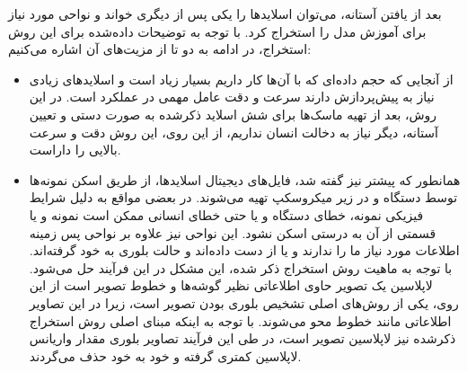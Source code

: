 بعد از یافتن آستانه، می‌توان اسلاید‌ها را یکی پس از دیگری خواند و نواحی مورد نیاز برای آموزش مدل را استخراج کرد.
با توجه به توضیحات داده‌شده برای این روش استخراج، در ادامه به دو تا از مزیت‌های آن اشاره می‌کنیم:
\begin{itemize}
    \item از آنجایی که حجم داده‌ای که با آن‌ها کار داریم بسیار زیاد است و اسلاید‌های زیادی نیاز به پیش‌پردازش دارند سرعت و دقت عامل مهمی در عملکرد است.
    در این روش، بعد از تهیه ماسک‌ها برای شش اسلاید ذکر‌شده به صورت دستی و تعیین آستانه، دیگر نیاز به دخالت انسان نداریم، از این روی، این روش دقت و سرعت بالایی را داراست.
    \item همانطور که پیشتر نیز گفته شد، فایل‌های دیجیتال اسلاید‌ها، از طریق اسکن نمونه‌ها توسط دستگاه و در زیر میکروسکپ تهیه می‌شوند.
    در بعضی مواقع به دلیل شرایط فیزیکی نمونه، خطای دستگاه و یا حتی خطای انسانی ممکن است نمونه و یا قسمتی از آن به درستی اسکن نشود.
    این نواحی نیز علاوه بر نواحی پس زمینه اطلاعات مورد نیاز ما را ندارند و یا از دست داده‌اند و حالت بلوری به خود گرفته‌اند.
    با توجه به ماهیت روش استخراج ذکر شده، این مشکل در این فرآیند حل می‌شود.
    لاپلاسین یک تصویر حاوی اطلاعاتی نظیر گوشه‌ها و خطوط تصویر است از این روی، یکی از روش‌های اصلی تشخیص بلوری بودن تصویر است، زیرا در این تصاویر اطلاعاتی مانند خطوط محو می‌شوند.
    با توجه به اینکه مبنای اصلی روش استخراج ذکر‌شده نیز لاپلاسین تصویر است، در طی این فرآیند تصاویر بلوری مقدار واریانس لاپلاسین کمتری گرفته و خود به خود حذف می‌گردند.
\end{itemize}
